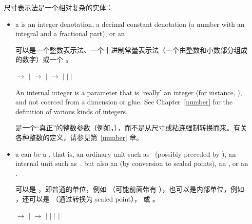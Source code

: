 尺寸表示法是一个相对复杂的实体：
\begin{itemize} \item a  is an integer denotation,
 a decimal constant denotation (a number with an integral and
 a fractional part),
 or an 

  可以是一个整数表示法、一个十进制常量表示法（一个由整数和小数部分组成的数字）或一个 。
 \begin{disp}\PopIndentLevel
       $\longrightarrow$  
      $|$ \nl
       $\longrightarrow$ \nl
      \indent $|$ \nl
       $\longrightarrow$ 
      $|$ \nl
      \indent $|$ \nl
      \indent $|$ 
 \end{disp}
 An internal integer is a parameter that is `really' an
\alt
 integer (for instance, ), and not coerced from a dimension or glue.
 See Chapter~\ref{number}
 for the definition of various kinds of integers.

  是一个“真正”的整数参数（例如，），而不是从尺寸或粘连强制转换而来。有关各种整数的定义，请参见第~\ref{number} 章。
\item a  can be 
 a , that is, an ordinary unit such as~ 
 (possibly preceded by ),
 an internal unit such as~, but also an 
 (by conversion to scaled points),
 an , or an .

  可以是 ，即普通的单位，例如 （可能前面带有 ），也可以是内部单位，例如 ，还可以是 （通过转换为 scaled point）， 或 。
 \begin{disp}\PopIndentLevel
       $\longrightarrow$
      \nl
      \indent $|$ 
      \nl 
       $\longrightarrow$ 
      \nl
      \indent $|$ 
              $|$ \nl
      \indent $|$  $|$ 
      \end{disp}
\end{itemize}

